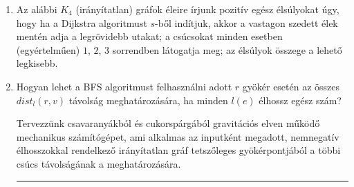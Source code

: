 \documentclass[a4paper,12pt]{article}
\begin{document}
\begin{enumerate}
        \item Az alábbi $K_4$ (irányítatlan) gráfok éleire írjunk pozitív egész élsúlyokat úgy, hogy ha a Dijkstra algoritmust $s$-ből indítjuk, akkor a vastagon szedett élek mentén adja a legrövidebb utakat; a csúcsokat minden esetben (egyértelműen) $1$, $2$, $3$ sorrendben látogatja meg; az élsúlyok összege a lehető legkisebb.
        \begin{figure}[!h]
            \centering
            \begin{subfigure}{0.15\textwidth}
                \centering
                
            \end{subfigure}
            \begin{subfigure}{0.15\textwidth}
                \centering
                
            \end{subfigure}
            \begin{subfigure}{0.15\textwidth}
                \centering
                
            \end{subfigure}
            \begin{subfigure}{0.15\textwidth}
                \centering
                
            \end{subfigure}
            \begin{subfigure}{0.15\textwidth}
                \centering
                
            \end{subfigure}
            \begin{subfigure}{0.15\textwidth}
                \centering
                
            \end{subfigure}
        \end{figure}

        \item Hogyan lehet a BFS algoritmust felhasználni adott $r$ gyökér esetén az összes $dist_l(r, v)$ távolság meghatározására, ha minden $l(e)$ élhossz egész szám?
        
        Tervezzünk csavaranyákból és cukorspárgából gravitációs elven működő mechanikus számítógépet, ami alkalmas az inputként megadott, nemnegatív élhosszokkal rendelkező irányítatlan gráf tetszőleges gyökérpontjából a többi csúcs távolságának a meghatározására.

        \hrule


\end{enumerate}
\end{document}
